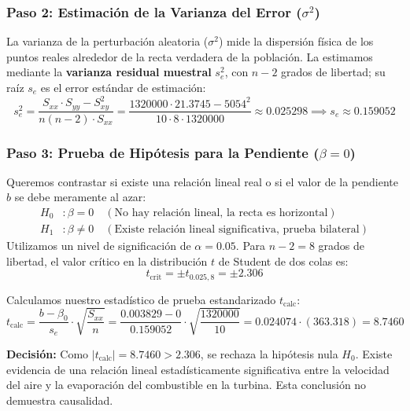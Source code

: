 \documentclass[11pt,a4paper]{article}
\begin{document}
    \subsubsection*{Paso 2: Estimación de la Varianza del Error ($\sigma^2$)}
    La varianza de la perturbación aleatoria ($\sigma^2$) mide la dispersión física de los puntos reales alrededor de la recta verdadera de la población. La estimamos mediante la \textbf{varianza residual muestral} $s_e^2$, con $n-2$ grados de libertad; su raíz $s_e$ es el error estándar de estimación:
    \begin{equation}
        s_e^2 = \frac{S_{xx} \cdot S_{yy} - S_{xy}^2}{n(n-2) \cdot S_{xx}} = \frac{1320000 \cdot 21.3745 - 5054^2}{10 \cdot 8 \cdot 1320000} \approx \mathbf{0.025298} \implies s_e \approx \mathbf{0.159052}
    \end{equation}

    \subsubsection*{Paso 3: Prueba de Hipótesis para la Pendiente ($\beta = 0$)}
    Queremos contrastar si existe una relación lineal real o si el valor de la pendiente $b$ se debe meramente al azar:
    \begin{align*}
        H_0&: \beta = 0 \quad (\text{No hay relación lineal, la recta es horizontal}) \\
        H_1&: \beta \neq 0 \quad (\text{Existe relación lineal significativa, prueba bilateral})
    \end{align*}
    Utilizamos un nivel de significación de $\alpha = 0.05$. Para $n-2 = 8$ grados de libertad, el valor crítico en la distribución $t$ de Student de dos colas es:
    \[ t_{\text{crit}} = \pm t_{0.025, 8} = \mathbf{\pm 2.306} \]

    Calculamos nuestro estadístico de prueba estandarizado $t_{\text{calc}}$:
    \begin{equation}
        t_{\text{calc}} = \frac{b - \beta_0}{s_e} \cdot \sqrt{\frac{S_{xx}}{n}} = \frac{0.003829 - 0}{0.159052} \cdot \sqrt{\frac{1320000}{10}} = 0.024074 \cdot (363.318) = \mathbf{8.7460}
    \end{equation}

    \textbf{Decisión:} Como $|t_{\text{calc}}| = 8.7460 > 2.306$, se rechaza la hipótesis nula $H_0$. Existe evidencia de una relación lineal estadísticamente significativa entre la velocidad del aire y la evaporación del combustible en la turbina. Esta conclusión no demuestra causalidad.
\end{document}
